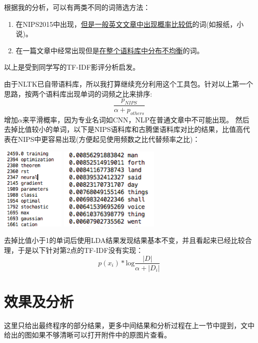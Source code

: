\documentclass{article}
\begin{document}
根据我的分析，可以有两类不同的词筛选方法：
\begin{enumerate}
	\item	在NIPS2015中出现，\underline{但是一般英文文章中出现概率比较低}的词(如报纸，小说)。
	\item	在一篇文章中经常出现但是\underline{在整个语料库中分布不均衡}的词。
\end{enumerate}
以上是受到同学写的TF-IDF影评分析启发。

由于NLTK已自带语料库，所以我打算继续充分利用这个工具包。针对以上第一个思路，按两个语料库出现单词的词频之比来排序:
\begin{displaymath}
	\frac{p_{NIPS}}{\alpha + p_{others}}
\end{displaymath}
增加$\alpha$来平滑概率，因为专业名词如CNN，NLP在普通文章中不可能出现。
然后去掉比值较小的单词，以下是NIPS语料库和古腾堡语料库对比的结果，比值高代表在NIPS中更容易出现(方便起见使用频数之比代替频率之比)：
\begin{center}
\includegraphics[height=4.0cm]{section3/high}
\includegraphics[height=4.0cm]{section3/low}
\end{center}
去掉比值小于1的单词后使用LDA结果发现结果基本不变，并且看起来已经比较合理，于是以下针对第2点的TF-IDF没有实现：
\begin{displaymath}
	p(x_i) * \mathrm{log} \frac{|D|}{\alpha + |D_i|}
\end{displaymath}

\section{效果及分析}
这里只给出最终程序的部分结果，更多中间结果和分析过程在上一节中提到，文中给出的图如果不够清晰可以打开附件中的原图片查看。
\end{document}
